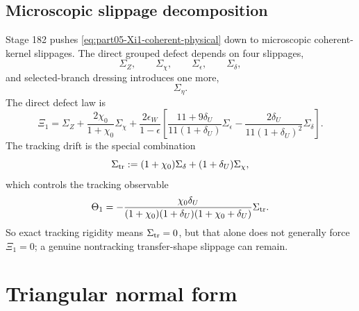 \subsection{Microscopic slippage decomposition}
Stage 182 pushes \eqref{eq:part05-Xi1-coherent-physical} down to microscopic coherent-kernel slippages.  The direct grouped defect depends on four slippages,
\begin{equation}
\label{eq:part05-slippage-four}
\Sigma_Z,
\qquad
\Sigma_\chi,
\qquad
\Sigma_\epsilon,
\qquad
\Sigma_\delta,
\end{equation}
and selected-branch dressing introduces one more,
\begin{equation}
\label{eq:part05-slippage-eta}
\Sigma_\eta.
\end{equation}
The direct defect law is
\begin{equation}
\label{eq:part05-Xi1-slippage-law}
\Xi_1
=
\Sigma_Z
+
\frac{2\chi_0}{1+\chi_0}\Sigma_\chi
+
\frac{2\epsilon_W}{1-\epsilon}
\left[
\frac{11+9\delta_U}{11(1+\delta_U)}\Sigma_\epsilon
-
\frac{2\delta_U}{11(1+\delta_U)^2}\Sigma_\delta
\right].
\end{equation}
The tracking drift is the special combination
\begin{equation}
\label{eq:part05-Sigma-tr-def}
\Sigma_{\rm tr}:=(1+\chi_0)\Sigma_\delta+(1+\delta_U)\Sigma_\chi,
\end{equation}
which controls the tracking observable
\begin{equation}
\label{eq:part05-Theta-Sigma-tr}
\Theta_1
=
-
\frac{\chi_0\delta_U}{(1+\chi_0)(1+\delta_U)(1+\chi_0+\delta_U)}
\Sigma_{\rm tr}.
\end{equation}
So exact tracking rigidity means \(\Sigma_{\rm tr}=0\), but that alone does not generally force \(\Xi_1=0\); a genuine nontracking transfer-shape slippage can remain.


\section{Triangular normal form}
\label{sec:part05_weak_axisymmetric_orbit:triangular-normal-form}

